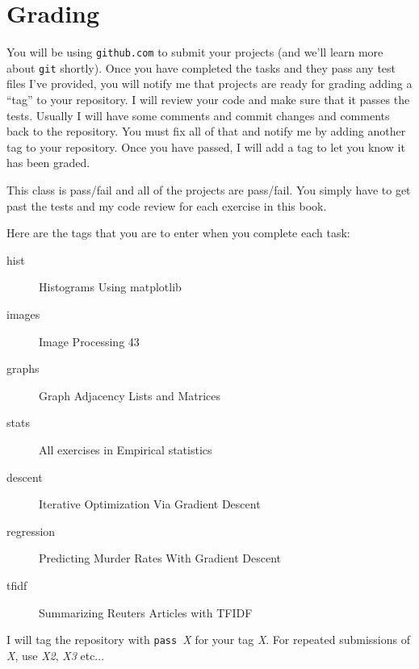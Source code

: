 \section{Grading}

You will be using {\tt github.com} to submit your projects (and we'll learn more about {\tt git} shortly).  Once you have completed the tasks and they pass any test files I've provided, you will notify me that projects are ready for grading adding a ``tag'' to your repository.  I will review your code and make sure that it passes the tests. Usually I will have some comments and commit changes and comments back to the repository. You must fix all of that and notify me by adding another tag to your repository. Once you have passed, I will add a tag to let you know it has been graded.

This class is pass/fail and all of the projects are pass/fail. You simply have to get past the tests and my code review for each exercise in this book.

Here are the tags that you are to enter when you complete each task:

\begin{description}
\item[hist] Histograms Using matplotlib
\item[images] Image Processing 43
\item[graphs] Graph Adjacency Lists and Matrices
\item[stats] All exercises in Empirical statistics
\item[descent] Iterative Optimization Via Gradient Descent
\item[regression] Predicting Murder Rates With Gradient Descent
\item[tfidf] Summarizing Reuters Articles with TFIDF
\end{description}

I will tag the repository with {\tt pass }{\em X} for your tag {\em X}. For repeated submissions of {\em X}, use {\em X2}, {\em X3} etc...